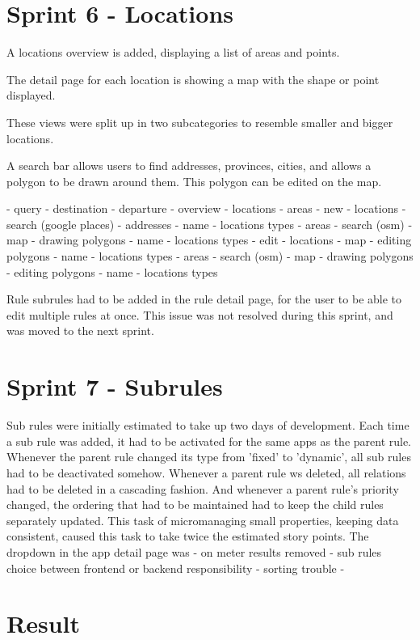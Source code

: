 %
\section{Sprint 6 - Locations}
A locations overview is added, displaying a list of areas and points.

The detail page for each location is showing a map with the shape or point displayed.

These views were split up in two subcategories to resemble smaller and bigger locations.

A search bar allows users to find addresses, provinces, cities, and allows a polygon to be drawn around them. This polygon can be edited on the map.

- query
	- destination
	- departure
- overview
	- locations
	- areas
- new
	- locations
		- search (google places)
		- addresses
		- name
		- locations types
	- areas
		- search (osm)
		- map
			- drawing polygons
		- name
		- locations types
- edit
	- locations
		- map
		  - editing polygons
		- name
		- locations types
	- areas
		- search (osm)
		- map
			- drawing polygons
			- editing polygons
		- name
		- locations types

Rule subrules had to be added in the rule detail page, for the user to be able to edit multiple rules at once. This issue was not resolved during this sprint, and was moved to the next sprint.

%
\section{Sprint 7 - Subrules}
Sub rules were initially estimated to take up two days of development. Each time a sub rule was added, it had to be activated for the same apps as the parent rule. Whenever the parent rule changed its type from 'fixed' to 'dynamic', all sub rules had to be deactivated somehow. Whenever a parent rule ws deleted, all relations had to be deleted in a cascading fashion. And whenever a parent rule's priority changed, the ordering that had to be maintained had to keep the child rules separately updated. This task of micromanaging small properties, keeping data consistent, caused this task to take twice the estimated story points. The dropdown in the app detail page was
- on meter results removed
- sub rules choice between frontend or backend responsibility
- sorting trouble
-


%
\section{Result}
